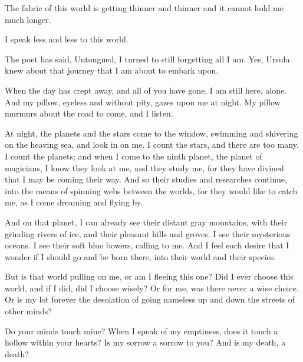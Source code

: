 The fabric of this world is getting thinner and thinner and it cannot
hold me much longer.

I speak less and less to this world.

The poet has said, Untongued, I turned to still forgetting all I am.
Yes, Ursula knew about that journey that I am about to embark upon.

When the day has crept away, and all of you have gone, I am still here,
alone. And my pillow, eyeless and without pity, gazes upon me at night.
My pillow murmurs about the road to come, and I listen.

At night, the planets and the stars come to the window, swimming and
shivering on the heaving sea, and look in on me. I count the stars, and
there are too many. I count the planets; and when I come to the ninth
planet, the planet of magicians, I know they look at me, and they study
me, for they have divined that I may be coming their way. And so their
studies and researches continue, into the means of spinning webs between
the worlds, for they would like to catch me, as I come dreaming and
flying by.

And on that planet, I can already see their distant gray mountains, with
their grinding rivers of ice, and their pleasant hills and groves. I see
their mysterious oceans. I see their soft blue bowers, calling to me.
And I feel such desire that I wonder if I should go and be born there,
into their world and their species.

But is that world pulling on me, or am I fleeing this one? Did I ever
choose this world, and if I did, did I choose wisely? Or for me, was
there never a wise choice. Or is my lot forever the desolation of going
nameless up and down the streets of other minds?

Do your minds touch mine? When I speak of my emptiness, does it touch a
hollow within your hearts? Is my sorrow a sorrow to you? And is my
death, a death?
